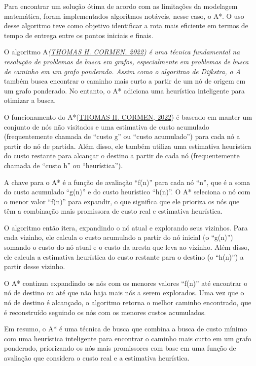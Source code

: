 Para encontrar um solução ótima de acordo com as limitações da modelagem
matemática, foram implementados algoritmos notáveis, nesse caso, o A*. O
uso desse algoritmo teve como objetivo identificar a rota mais eficiente
em termos de tempo de entrega entre os pontos iniciais e finais.

O algoritmo A\emph{(\hyperref[referuxeancias-bibliogruxe1ficas]{THOMAS
H. CORMEN, 2022}) é uma técnica fundamental na resolução de problemas de
busca em grafos, especialmente em problemas de busca de caminho em um
grafo ponderado. Assim como o algoritmo de Dijkstra, o A} também busca
encontrar o caminho mais curto a partir de um nó de origem em um grafo
ponderado. No entanto, o A* adiciona uma heurística inteligente para
otimizar a busca.

O funcionamento do A*(\hyperref[referuxeancias-bibliogruxe1ficas]{THOMAS
H. CORMEN, 2022}) é baseado em manter um conjunto de nós não visitados e
uma estimativa de custo acumulado (frequentemente chamada de ``custo g''
ou ``custo acumulado'') para cada nó a partir do nó de partida. Além
disso, ele também utiliza uma estimativa heurística do custo restante
para alcançar o destino a partir de cada nó (frequentemente chamada de
``custo h'' ou ``heurística'').

A chave para o A* é a função de avaliação ``f(n)'' para cada nó ``n'',
que é a soma do custo acumulado ``g(n)'' e do custo heurístico ``h(n)''.
O A* seleciona o nó com o menor valor ``f(n)'' para expandir, o que
significa que ele prioriza os nós que têm a combinação mais promissora
de custo real e estimativa heurística.

O algoritmo então itera, expandindo o nó atual e explorando seus
vizinhos. Para cada vizinho, ele calcula o custo acumulado a partir do
nó inicial (o ``g(n)'') somando o custo do nó atual e o custo da aresta
que leva ao vizinho. Além disso, ele calcula a estimativa heurística do
custo restante para o destino (o ``h(n)'') a partir desse vizinho.

O A* continua expandindo os nós com os menores valores ``f(n)'' até
encontrar o nó de destino ou até que não haja mais nós a serem
explorados. Uma vez que o nó de destino é alcançado, o algoritmo retorna
o melhor caminho encontrado, que é reconstruído seguindo os nós com os
menores custos acumulados.

Em resumo, o A* é uma técnica de busca que combina a busca de custo
mínimo com uma heurística inteligente para encontrar o caminho mais
curto em um grafo ponderado, priorizando os nós mais promissores com
base em uma função de avaliação que considera o custo real e a
estimativa heurística.

